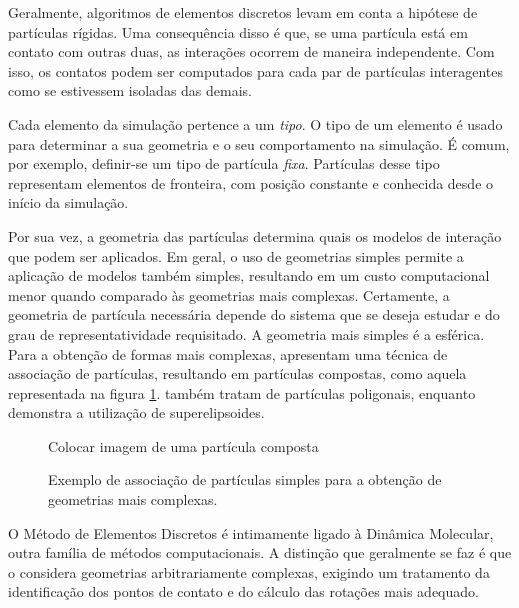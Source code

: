 Geralmente, algoritmos de elementos discretos levam em conta a hipótese de partículas rígidas. Uma consequência disso é que, se uma partícula está em contato com outras duas, as interações ocorrem de maneira independente. Com isso, os contatos podem ser computados para cada par de partículas interagentes como se estivessem isoladas das demais.

Cada elemento da simulação pertence a um \textit{tipo}. O tipo de um elemento é usado para determinar a sua geometria e o seu comportamento na simulação. É comum, por exemplo, definir-se um tipo de partícula \textit{fixa}. Partículas desse tipo representam elementos de fronteira, com posição constante e conhecida desde o início da simulação.

Por sua vez, a geometria das partículas determina quais os modelos de interação que podem ser aplicados. Em geral, o uso de geometrias simples permite a aplicação de modelos também simples, resultando em um custo computacional menor quando comparado às geometrias mais complexas. Certamente, a geometria de partícula necessária depende do sistema que se deseja estudar e do grau de representatividade requisitado. A geometria mais simples é a esférica. Para a obtenção de formas mais complexas,  apresentam uma técnica de associação de partículas, resultando em partículas compostas, como aquela representada na figura \ref{fig:composite_particle}.  também tratam de partículas poligonais, enquanto  demonstra a utilização de superelipsoides.

\begin{figure}[h]
	\caption{Exemplo de associação de partículas simples para a obtenção de geometrias mais complexas.}
	\begin{center}
		\alert{Colocar imagem de uma partícula composta}
	\end{center}
	\label{fig:composite_particle}
\end{figure}

O Método de Elementos Discretos é intimamente ligado à Dinâmica Molecular, outra família de métodos computacionais. A distinção que geralmente se faz é que o \DEM{} considera geometrias arbitrariamente complexas, exigindo um tratamento da identificação dos pontos de contato e do cálculo das rotações mais adequado.

